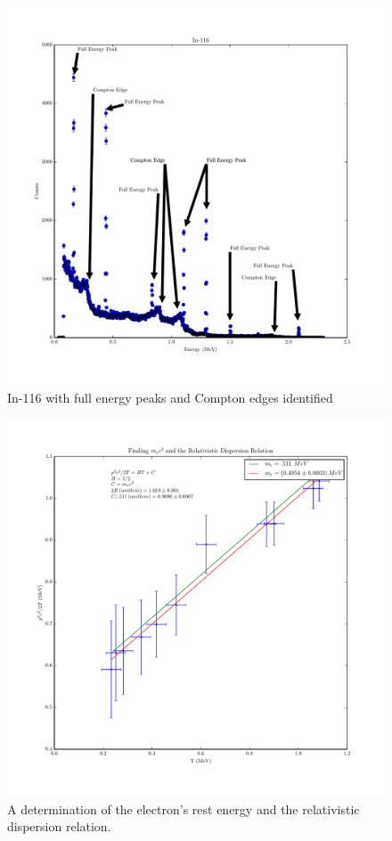\documentclass[reprint, nobibnotes, amssymb, amsmath, amsfonts, physics, mathtools, mathrsfs, floatfix]{revtex4-1}
\begin{document}
\begin{widetext}
      \begin{figure}[h]
        \centering
        \includegraphics[width=\linewidth]{../plots/In-116.pdf}
        \caption{In-116 with full energy peaks and Compton edges identified \label{fig:in}}
      \end{figure}

      \begin{figure}[h]
        \centering
        \includegraphics[width=\linewidth]{../plots/dispersion.pdf}
        \caption{A determination of the electron's rest energy and the relativistic dispersion relation. \label{fig:mnr}}
      \end{figure}


\end{widetext}
\end{document}
